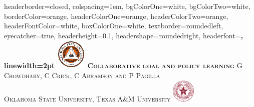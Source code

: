 \documentclass[portrait,a0paper,fontscale=0.28]{baposter} %
\begin{document}
\begin{poster}
{
headerborder=closed, %
colspacing=1em, %
bgColorOne=white, %
bgColorTwo=white, %
borderColor=orange, %
headerColorOne=orange, %
headerColorTwo=orange, %
headerFontColor=white, %
boxColorOne=white, %
textborder=roundedleft, %
eyecatcher=true, %
headerheight=0.1\textheight, %
headershape=roundedright, %
headerfont=\Large\bf\textsc, %
linewidth=2pt %
}
%
{\includegraphics[height=4em]{OSUlogo}} %
{\bf\textsc{Collaborative goal and policy learning}} %
{\textsc{G Chowdhary, C Crick, C Abramson and P Pagilla\\Oklahoma State University, Texas A\&M University \hspace{12pt} }} %
{\includegraphics[height=3em]{tamu-logo}} %



\end{poster}
\end{document}
